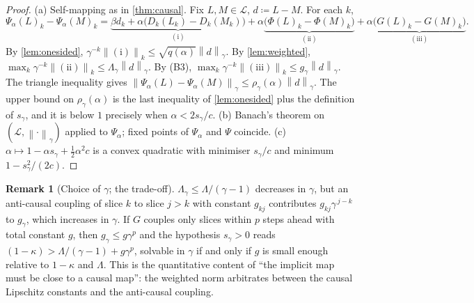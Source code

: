 \documentclass[11pt,a4paper]{article}
\theoremstyle{plain}
\theoremstyle{definition}
\theoremstyle{definition}
\newtheorem{remark}[theorem]{Remark}
\newcommand{\norm}[1]{\left\lVert #1 \right\rVert}
\newcommand{\Lev}{L}
\newcommand{\Phimap}{\Phi}
\newcommand{\Psimap}{\Psi}
\newcommand{\Psal}{\Psi_\alpha}
\newcommand{\Lset}{\mathcal{L}}
\begin{document}
\begin{proof}
(a) Self-mapping as in \cref{thm:causal}. Fix $\Lev, M \in \Lset$, $d \coloneqq \Lev - M$. For each $k$,
\[
  \Psal(\Lev)_k - \Psal(M)_k
  = \underbrace{\beta d_k + \alpha \bigl( D_k(\Lev_k) - D_k(M_k) \bigr)}_{\mathrm{(i)}}
  + \alpha \underbrace{\bigl( \Phimap(\Lev)_k - \Phimap(M)_k \bigr)}_{\mathrm{(ii)}}
  + \alpha \underbrace{\bigl( G(\Lev)_k - G(M)_k \bigr)}_{\mathrm{(iii)}} .
\]
By \cref{lem:onesided}, $\gamma^{-k} \norm{\mathrm{(i)}}_k \le \sqrt{q(\alpha)} \norm{d}_\gamma$. By \cref{lem:weighted}, $\max_k \gamma^{-k} \norm{\mathrm{(ii)}}_k \le \Lambda_\gamma \norm{d}_\gamma$. By (B3), $\max_k \gamma^{-k} \norm{\mathrm{(iii)}}_k \le g_\gamma \norm{d}_\gamma$. The triangle inequality gives $\norm{\Psal(\Lev) - \Psal(M)}_\gamma \le \rho_\gamma(\alpha) \norm{d}_\gamma$. The upper bound on $\rho_\gamma(\alpha)$ is the last inequality of \cref{lem:onesided} plus the definition of $s_\gamma$, and it is below $1$ precisely when $\alpha < 2 s_\gamma / c$.
(b) Banach's theorem on $(\Lset, \norm{\cdot}_\gamma)$ applied to $\Psal$; fixed points of $\Psal$ and $\Psimap$ coincide.
(c) $\alpha \mapsto 1 - \alpha s_\gamma + \tfrac12 \alpha^2 c$ is a convex quadratic with minimiser $s_\gamma / c$ and minimum $1 - s_\gamma^2 / (2c)$.
\end{proof}

\begin{remark}[Choice of $\gamma$; the trade-off]\label{rem:tradeoff}
$\Lambda_\gamma \le \Lambda / (\gamma - 1)$ decreases in $\gamma$, but an anti-causal coupling of slice $k$ to slice $j > k$ with constant $g_{kj}$ contributes $g_{kj} \gamma^{\,j-k}$ to $g_\gamma$, which increases in $\gamma$. If $G$ couples only slices within $p$ steps ahead with total constant $g$, then $g_\gamma \le g \gamma^p$ and the hypothesis $s_\gamma > 0$ reads $(1 - \kappa) > \Lambda/(\gamma - 1) + g \gamma^p$, solvable in $\gamma$ if and only if $g$ is small enough relative to $1 - \kappa$ and $\Lambda$. This is the quantitative content of ``the implicit map must be close to a causal map'': the weighted norm arbitrates between the causal Lipschitz constants and the anti-causal coupling.
\end{remark}
\end{document}

